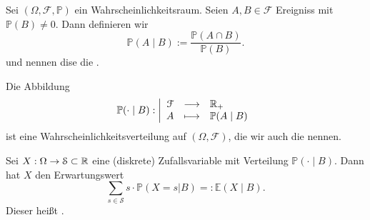 \begin{definition}\label{def:bedingte-wahrscheinlichkeit}
    Sei $(\Omega, \mathcal{F}, \mathbb{P})$ ein Wahrscheinlichkeitsraum. Seien $A,B\in \mathcal{F}$ Ereigniss mit $\mathbb{P}(B) \neq  0$. Dann definieren wir
    \[
        \mathbb{P}(A \mid B) := \frac{\mathbb{P}(A\cap B)}{\mathbb{P}(B)}
    .\] 
    und nennen dise die . 
\end{definition}
\begin{remark}
       Die Abbildung
               \begin{equation*}
                   \mathbb{P}(\cdot \mid B): \left| \begin{array}{c c l} 
               \mathcal{F} & \longrightarrow & \mathbb{R}_+ \\
               A & \longmapsto &  \mathbb{P}(A\mid B)
               \end{array} \right.
           \end{equation*}
           ist eine Wahrscheinlichkeitsverteilung auf $(\Omega,\mathcal{F})$, die wir auch die  nennen.
\end{remark}
\begin{definition}\label{def:bedingter-erwartungswert}
    Sei $X:\Omega\to \mathcal{S}\subset \mathbb{R}$ eine (diskrete) Zufallsvariable mit Verteilung $\mathbb{P}(\cdot \mid B)$. Dann hat $X$ den Erwartungswert
    \[
        \sum_{s\in \mathcal{S}} s\cdot \mathbb{P}(X = s | B) =: \mathbb{E}(X\mid B)
    .\] 
    Dieser heißt . 
\end{definition}
